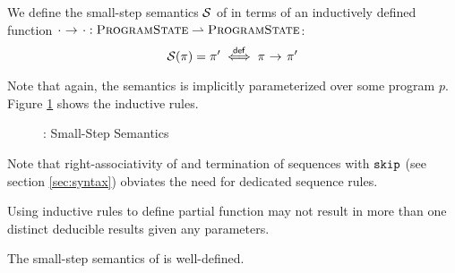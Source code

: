 
We define the small-step semantics $\mathcal{S}$ of \svlidf in terms of an inductively defined function ${\cdot} \,\,{\rightarrow^{}}\,\, {\cdot} : \textup{\textsc{ProgramState}} \rightharpoonup \textup{\textsc{ProgramState}}$:
\begin{displaymath}
\mathcal{S}(\pi) = \pi' \overset{\textup{\textsf{def}}}{\iff} {\pi} \,\,{\rightarrow^{}}\,\, {\pi'}
\end{displaymath}

Note that again, the semantics is implicitly parameterized over some program $p$.
Figure \ref{fig:svl-sem-dyn-sstep} shows the inductive rules.
\begin{figure}
    \boxed{\sstep{\pi}{\pi}}
    
    \caption{\svlidf: Small-Step Semantics}
    \label{fig:svl-sem-dyn-sstep}
\end{figure}
Note that right-associativity of \ttt{;} and termination of sequences with $\textup{\texttt{skip}}$ (see section \ref{sec:syntax}) obviates the need for dedicated sequence rules.

Using inductive rules to define partial function may not result in more than one distinct deducible results given any parameters.
\begin{lemma}
    The small-step semantics of \svlidf is well-defined.
\end{lemma}
